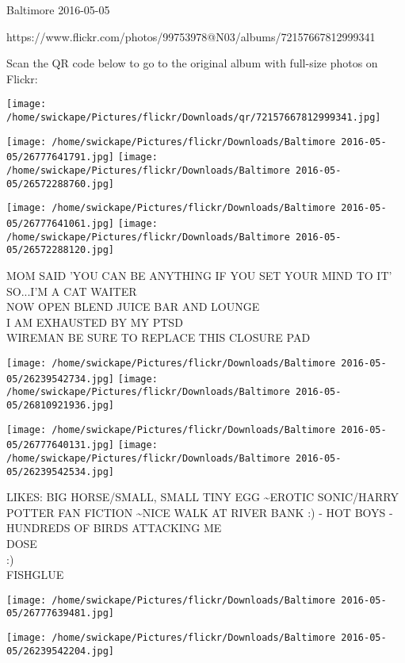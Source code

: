 \documentclass[10pt,letterpaper]{article}
\begin{document}
Baltimore 2016-05-05

https://www.flickr.com/photos/99753978@N03/albums/72157667812999341

Scan the QR code below to go to the original album with full-size photos on Flickr:

\texttt{[image: /home/swickape/Pictures/flickr/Downloads/qr/72157667812999341.jpg]}
\pagebreak

\texttt{[image: /home/swickape/Pictures/flickr/Downloads/Baltimore 2016-05-05/26777641791.jpg]}
\texttt{[image: /home/swickape/Pictures/flickr/Downloads/Baltimore 2016-05-05/26572288760.jpg]}

\texttt{[image: /home/swickape/Pictures/flickr/Downloads/Baltimore 2016-05-05/26777641061.jpg]}
\texttt{[image: /home/swickape/Pictures/flickr/Downloads/Baltimore 2016-05-05/26572288120.jpg]}

MOM SAID 'YOU CAN BE ANYTHING IF YOU SET YOUR MIND TO IT' SO...I'M A CAT WAITER\\
NOW OPEN BLEND JUICE BAR AND LOUNGE\\
I AM EXHAUSTED BY MY PTSD\\
WIREMAN BE SURE TO REPLACE THIS CLOSURE PAD
\pagebreak

\texttt{[image: /home/swickape/Pictures/flickr/Downloads/Baltimore 2016-05-05/26239542734.jpg]}
\texttt{[image: /home/swickape/Pictures/flickr/Downloads/Baltimore 2016-05-05/26810921936.jpg]}

\texttt{[image: /home/swickape/Pictures/flickr/Downloads/Baltimore 2016-05-05/26777640131.jpg]}
\texttt{[image: /home/swickape/Pictures/flickr/Downloads/Baltimore 2016-05-05/26239542534.jpg]}

LIKES: BIG HORSE/SMALL, SMALL TINY EGG \textasciitilde{}EROTIC SONIC/HARRY POTTER FAN FICTION \textasciitilde{}NICE WALK AT RIVER BANK :) {-} HOT BOYS {-} HUNDREDS OF BIRDS ATTACKING ME\\
DOSE\\
:)\\
FISHGLUE
\pagebreak

\texttt{[image: /home/swickape/Pictures/flickr/Downloads/Baltimore 2016-05-05/26777639481.jpg]}

\vspace{0.25in}
\texttt{[image: /home/swickape/Pictures/flickr/Downloads/Baltimore 2016-05-05/26239542204.jpg]}
\end{document}
